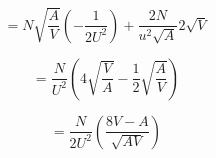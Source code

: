 \documentclass[12pt,a4paper]{article}
\begin{document}
\begin{enumerate}
\begin{equation*}
    = N \sqrt{\frac{A}{V}} (- \frac{1}{2 U^2}) + \frac{2N}{u^2 \sqrt{A}} 2 \sqrt{V}
\end{equation*}

\begin{equation*}
    = \frac{N}{U^2} \left(4 \sqrt{\frac{V}{A}} - \frac{1}{2}\sqrt{\frac{A}{V}}\right)
\end{equation*}

\begin{equation*}
    =\frac{N}{2U^2} \left(\frac{8V - A}{\sqrt{AV}}\right)
\end{equation*}


    
    
\end{enumerate}
\end{document}
